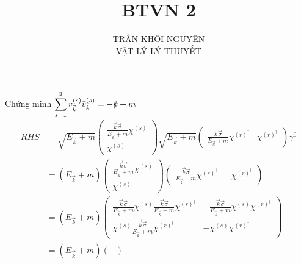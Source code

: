 \documentclass{article}
\title{\Huge{BTVN 2}}
\begin{document}
\setlength{\parindent}{20pt}

\author{TRẦN KHÔI NGUYÊN \\ VẬT LÝ LÝ THUYẾT}
\maketitle

Chứng minh $\displaystyle\sum_{s=1}^{2} v_{\vec{k}}^{(s)} \bar{v}_{k}^{(s)} = -\slashed{k} + m $
\begin{align*}
	RHS
	 & = \sqrt{E_{\vec{k}} + m }
	\begin{pmatrix}
		\frac{\vec{k}\vec{\sigma}}{E_{\vec{k}} + m } \chi^{(s)} \\
		\chi^{(s)}
	\end{pmatrix}
	\sqrt{E_{\vec{k}} + m }
	\begin{pmatrix}
		\frac{\vec{k}\vec{\sigma}}{E_{\vec{k}} + m } \chi^{(r)^{\dagger} } & \chi^{(r)^{\dagger} }
	\end{pmatrix}\gamma^0                                                                                                                                                                                                          \\
	 & = 	(E_{\vec{k}} + m)
	\begin{pmatrix}
		\frac{\vec{k}\vec{\sigma}}{E_{\vec{k}} + m } \chi^{(s)} \\
		\chi^{(s)}
	\end{pmatrix}
	\begin{pmatrix}
		\frac{\vec{k}\vec{\sigma}}{E_{\vec{k}} + m } \chi^{(r)^{\dagger} } & -\chi^{(r)^{\dagger} }
	\end{pmatrix}                                                                                                                                                                                                       \\
	 & =(E_{\vec{k}} + m)
	\begin{pmatrix}
		\frac{\vec{k}\vec{\sigma}}{E_{\vec{k}} + m } \chi^{(s)} \frac{\vec{k}\vec{\sigma}}{E_{\vec{k}} + m } \chi^{(r)^{\dagger} } & - \frac{\vec{k}\vec{\sigma}}{E_{\vec{k}} + m } \chi^{(s)}\chi^{(r)^{\dagger} } \\
		\chi^{(s)} \frac{\vec{k}\vec{\sigma}}{E_{\vec{k}} + m } \chi^{(r)^{\dagger} }                                              & -\chi^{(s)}\chi^{(r)^{\dagger}}
	\end{pmatrix} \\
	 & =(E_{\vec{k}} + m)
	\begin{pmatrix}

\end{pmatrix}
\end{align*}
\end{document}
